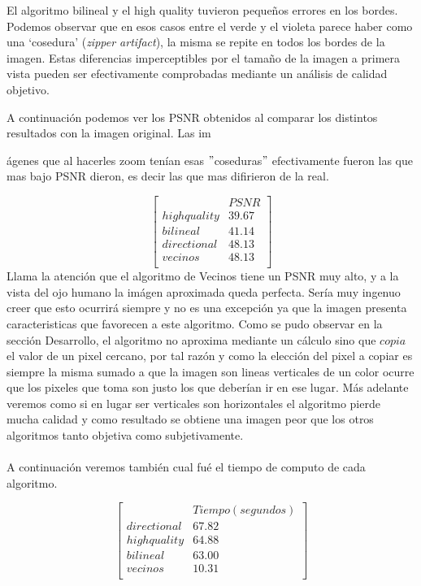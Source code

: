 El algoritmo bilineal y el high quality tuvieron pequeños errores en los bordes. Podemos observar que en esos casos entre el verde y el violeta parece haber como una `cosedura' (\textit{zipper artifact}), la misma se repite en todos los bordes de la imagen. Estas diferencias imperceptibles por el tamaño de la imagen a primera vista pueden ser efectivamente comprobadas mediante un análisis de calidad objetivo. 

A continuación podemos ver los PSNR obtenidos al comparar los distintos resultados con la imagen original. Las im{ágenes que al hacerles zoom tenían esas $"$coseduras$"$ efectivamente fueron las que mas bajo PSNR dieron, es decir las que mas difirieron de la real.

$$ 
\begin{bmatrix}
           &      PSNR     \\
       highquality    &   39.67   \\
       bilineal       &   41.14   \\
       directional    &   48.13    \\
       vecinos        &   48.13      \\
\end{bmatrix} 
$$
Llama la atención que el algoritmo de Vecinos tiene un PSNR muy alto, y a la vista del ojo humano la imágen aproximada queda perfecta. Sería muy ingenuo creer que esto ocurrirá siempre y no es una excepción ya que la imagen presenta caracteristicas que favorecen a este algoritmo. Como se pudo observar en la sección Desarrollo, el algoritmo no aproxima mediante un cálculo sino que $copia$ el valor de un pixel cercano, por tal razón y como la elección del pixel a copiar es siempre la misma sumado a que la imagen son lineas verticales de un color ocurre que los pixeles que toma son justo los que deberían ir en ese lugar. Más adelante veremos como si en lugar ser verticales son horizontales el algoritmo pierde mucha calidad y como resultado se obtiene una imagen peor que los otros algoritmos tanto objetiva como subjetivamente.
\\\\
A continuación veremos también cual fué el tiempo de computo de cada algoritmo.

$$ 
\begin{bmatrix}
           &      Tiempo (segundos)     \\
       directional    &   67.82    \\
       highquality    &   64.88   \\
       bilineal       &   63.00   \\
       vecinos        &   10.31      \\
\end{bmatrix} 
$$

}
